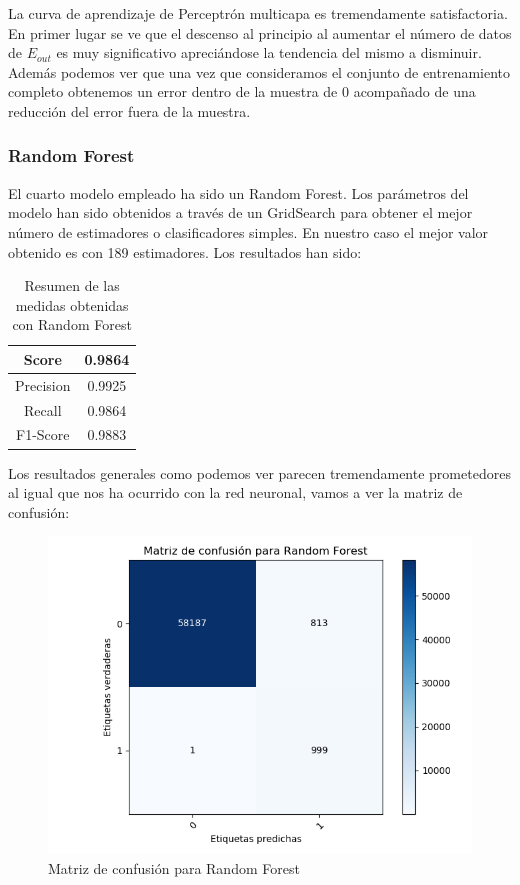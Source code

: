 La curva de aprendizaje de Perceptrón multicapa es tremendamente satisfactoria. En primer lugar se ve que el descenso al principio al aumentar el número de datos de $E_{out}$ es muy significativo apreciándose la tendencia del mismo a disminuir. Además podemos ver que una vez que consideramos el conjunto de entrenamiento completo obtenemos un error dentro de la muestra de 0 acompañado de una reducción del error fuera de la muestra.

\subsubsection{Random Forest}

El cuarto modelo empleado ha sido un Random Forest. Los parámetros del modelo han sido obtenidos a través de un GridSearch para obtener el mejor número de estimadores o clasificadores simples. En nuestro caso el mejor valor obtenido es con 189 estimadores. Los resultados han sido:

\begin{table}[H]
	\centering
	\begin{tabular}{|c|c|}
		\hline
		Score     & 0.9864   \\ \hline
		Precision & 0.9925  \\ \hline
		Recall    & 0.9864   \\ \hline
		F1-Score  & 0.9883 \\ \hline
	\end{tabular}
	\caption{Resumen de las medidas obtenidas con Random Forest}
\end{table}

Los resultados generales como podemos ver parecen tremendamente prometedores al igual que nos ha ocurrido con la red neuronal, vamos a ver la matriz de confusión:

\begin{figure}[H] %
	\centering
	\includegraphics[scale=0.6]{RandomForestConf.png}  %
	\caption{Matriz de confusión para Random Forest} 
	\label{fig:conf-rf}
\end{figure}

